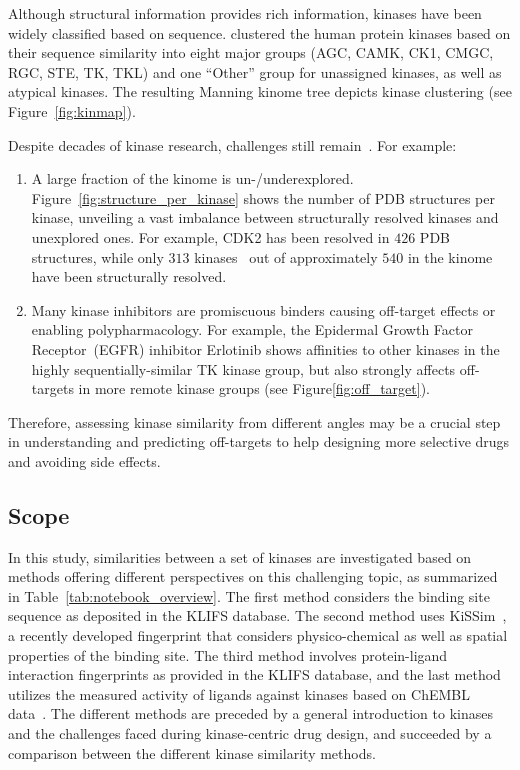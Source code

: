 \documentclass[9pt,training]{livecoms}
\begin{document}
Although structural information provides rich information, kinases have been widely classified based on sequence. \citet{Manning_2022_science} clustered the human protein kinases based on their sequence similarity into eight major groups (AGC, CAMK, CK1, CMGC, RGC, STE, TK, TKL) and one “Other” group for unassigned kinases, as well as atypical kinases. The resulting Manning kinome tree depicts kinase clustering (see Figure~\ref{fig:kinmap}).

Despite decades of kinase research, challenges still remain~\cite{Kooistra_2017_AnnualReportsMedicinalChemistry}. For example: \begin{enumerate}
    \item A large fraction of the kinome is un-/underexplored. Figure~\ref{fig:structure_per_kinase} shows the number of PDB structures per kinase, unveiling a vast imbalance between structurally resolved kinases and unexplored ones. For example, CDK2 has been resolved in $426$ PDB structures, while only $313$ kinases~\cite{klifs_feb_2022} out of approximately $540$ in the kinome~\cite{Kooistra_2017_AnnualReportsMedicinalChemistry} have been structurally resolved.
    \item Many kinase inhibitors are promiscuous binders causing off-target effects or enabling polypharmacology. For example, the Epidermal Growth Factor Receptor~(EGFR) inhibitor Erlotinib shows affinities to other kinases in the highly sequentially-similar TK kinase group, but also strongly affects off-targets in more remote kinase groups (see Figure\ref{fig:off_target}).
\end{enumerate}

Therefore, assessing kinase similarity from different angles may be a crucial step in understanding and predicting off-targets to help designing more selective drugs and avoiding side effects.

\subsection{Scope}
In this study, similarities between a set of kinases are investigated based on methods offering different perspectives on this challenging topic, as summarized in Table~\ref{tab:notebook_overview}. The first method considers the binding site sequence as deposited in the KLIFS database. The second method uses KiSSim~\cite{sydow_2021_kissim_chemrxiv}, a recently developed fingerprint that considers physico-chemical as well as spatial properties of the binding site. The third method involves protein-ligand interaction fingerprints as provided in the KLIFS database, and the last method utilizes the measured activity of ligands against kinases based on ChEMBL data~\cite{Gaulton_2016_nar}. The different methods are preceded by a general introduction to kinases and the challenges faced during kinase-centric drug design, and succeeded by a comparison between the different kinase similarity methods.
\end{document}
